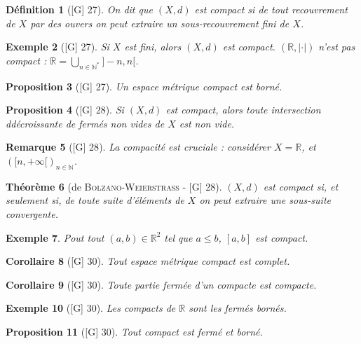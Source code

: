 \documentclass[10pt, a4paper, parskip=full, twoside, twocolumn]{report}
\newtheorem{definition}{Définition}
\newtheorem{theorem}[definition]{Théorème}
\newtheorem{proposition}[definition]{Proposition}
\newtheorem{corollary}[definition]{Corollaire}
\newtheorem{example}[definition]{Exemple}
\newtheorem{remark}[definition]{Remarque}
\newcommand{\IN}{\mathbb{N}}
\newcommand{\IR}{\mathbb{R}}
\begin{document}
\begin{definition}[\textnormal{[G] 27}]
	On dit que $(X,d)$ est \emph{compact} si de tout recouvrement de $X$ par des ouvers on peut extraire un sous-recouvrement fini de $X$.
\end{definition}

\begin{example}[\textnormal{[G] 27}]
	Si $X$ est fini, alors $(X,d)$ est compact.
	$(\IR,\vert\cdot\vert)$ n'est pas compact : $\IR = \bigcup_{n\in\IN^*}]-n,n[$.
\end{example}

\begin{proposition}[\textnormal{[G] 27}]
	Un espace métrique compact est borné.
\end{proposition}

\begin{proposition}[\textnormal{[G] 28}]
	Si $(X,d)$ est compact, alors toute intersection ddécroissante de fermés non vides de $X$ est non vide.
\end{proposition}

\begin{remark}[\textnormal{[G] 28}]
	La compacité est cruciale : considérer $X = \IR$, et $\left([n,+\infty[\right)_{n\in\IN}$.
\end{remark}

\begin{theorem}[de \textsc{Bolzano-Weierstrass} - \textnormal{[G] 28}]
	$(X,d)$ est compact si, et seulement si, de toute suite d'éléments de $X$ on peut extraire une sous-suite convergente.
\end{theorem}

\begin{example}
	Pout tout $(a,b)\in\IR^2$ tel que $a\leq b$, $[a,b]$ est compact.
\end{example}

\begin{corollary}[\textnormal{[G] 30}]
	Tout espace métrique compact est complet.
\end{corollary}

\begin{corollary}[\textnormal{[G] 30}]
	Toute partie fermée d'un compacte est compacte.
\end{corollary}

\begin{example}[\textnormal{[G] 30}]
	Les compacts de $\IR$ sont les fermés bornés.
\end{example}

\begin{proposition}[\textnormal{[G] 30}]
	Tout compact est fermé et borné.
\end{proposition}
\end{document}

